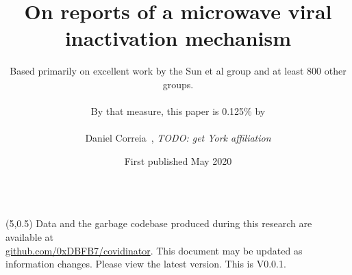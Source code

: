 \documentclass[paper.tex]{subfiles}
\begin{document}



\title{On reports of a microwave viral inactivation mechanism}

\date{First published May 2020}
\author{Based primarily on excellent work by the Sun et al group and at least 800 other groups.\\
	\\
		By that measure, this paper is 0.125\% by \\
		\\
		\small{{Daniel Correia}\ , \textit{TODO: get York affiliation}\footnotemark}}



\flushbottom 
\maketitle
\thispagestyle{empty}


\null\begin{tabular}[t]{l@{}}
	  \\
	
\end{tabular}


\begin{textblock}{10}(5,0.5)
\noindent Data and the garbage codebase produced during this research are available at \\ \href{https://www.github.com/0xDBFB7/covidinator}{github.com/0xDBFB7/covidinator}. This document may be updated as information changes. Please view the latest version. This is V0.0.1.
\end{textblock}
\end{document}
